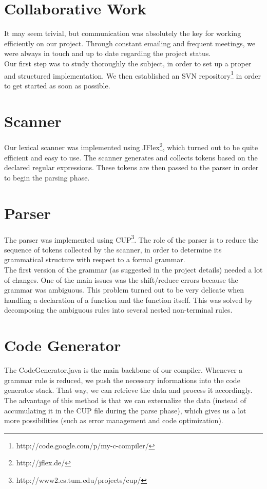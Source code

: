 \documentclass{scrartcl}
\begin{document}
\section{Collaborative Work}
It may seem trivial, but communication was absolutely the key for working efficiently on our project. Through constant emailing and frequent meetings, we were always in touch and up to date regarding the project status.\\
Our first step was to study thoroughly the subject, in order to set up a proper and structured implementation.
We then established an SVN repository\footnote{http://code.google.com/p/my-c-compiler/} in order to get started as soon as possible.

\section{Scanner}
Our lexical scanner was implemented using JFlex\footnote{http://jflex.de/}, which turned out to be quite efficient and easy to use. The scanner generates and collects tokens based on the declared regular expressions. These tokens are then passed to the parser in order to begin the parsing phase.

\section{Parser}
The parser was implemented using CUP\footnote{http://www2.cs.tum.edu/projects/cup/}. The role of the parser is to reduce the sequence of tokens collected by the scanner, in order to determine its grammatical structure with respect to a formal grammar.\\
The first version of the grammar (as suggested in the project details) needed a lot of changes. One of the main issues was the shift/reduce errors because the grammar was ambiguous. This problem turned out to be very delicate when handling a declaration of a function and the function itself. This was solved by decomposing the ambiguous rules into several nested non-terminal rules.

\section{Code Generator}
The CodeGenerator.java is the main backbone of our compiler. Whenever a grammar rule is reduced, we push the necessary informations into the code generator stack. That way, we can retrieve the data and process it accordingly. The advantage of this method is that we can externalize the data (instead of accumulating it in the CUP file during the parse phase), which gives us a lot more possibilities (such as error management and code optimization).\\
\end{document}
